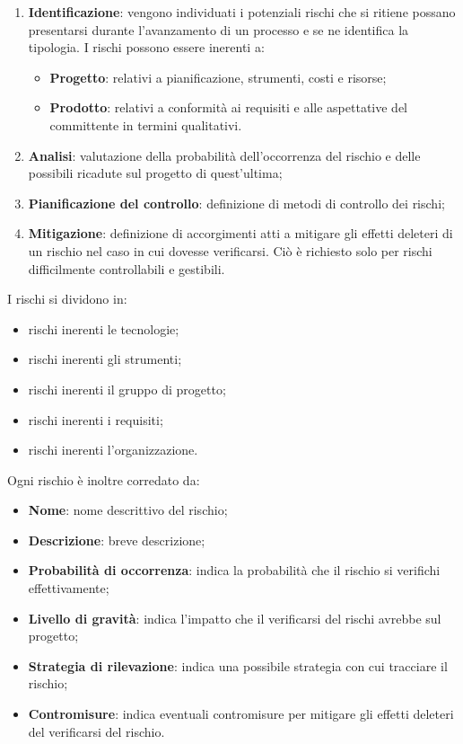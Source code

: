 \documentclass[../PianodiProgetto.tex]{subfiles}
\begin{document}
	\begin{enumerate}
		\item \textbf{Identificazione}: vengono individuati i potenziali rischi che si ritiene possano presentarsi durante
		l’avanzamento di un processo e se ne identifica la tipologia. I rischi possono essere inerenti a: 
		\begin{itemize}
			\item \textbf{Progetto}: relativi a pianificazione, strumenti, costi e risorse;
			\item \textbf{Prodotto}: relativi a conformità ai requisiti e alle aspettative del committente in termini qualitativi.
		\end{itemize}
		\item \textbf{Analisi}: valutazione della probabilità dell’occorrenza del rischio e delle possibili ricadute
		sul progetto di quest'ultima;
		\item \textbf{Pianificazione del controllo}: definizione di metodi di controllo dei rischi;
		\item \textbf{Mitigazione}: definizione di accorgimenti atti a mitigare gli effetti deleteri di un rischio nel caso in cui dovesse verificarsi. Ciò è richiesto solo per rischi
		difficilmente controllabili e gestibili.
	\end{enumerate}

	I rischi si dividono in:
		\begin{itemize}
			\item rischi inerenti le tecnologie;
			\item rischi inerenti gli strumenti;
			\item rischi inerenti il gruppo di progetto;
			\item rischi inerenti i requisiti;
			\item rischi inerenti l'organizzazione.
		\end{itemize}

	Ogni rischio è inoltre corredato da:
	
	\begin{itemize}
		\item \textbf{Nome}: nome descrittivo del rischio;
		\item \textbf{Descrizione}: breve descrizione;
		\item \textbf{Probabilità di occorrenza}: indica la probabilità che il rischio si verifichi effettivamente;
		\item \textbf{Livello di gravità}: indica l'impatto che il verificarsi del rischi avrebbe sul progetto;
		\item \textbf{Strategia di rilevazione}: indica una possibile strategia con cui tracciare il rischio;
		\item \textbf{Contromisure}: indica eventuali contromisure per mitigare gli effetti deleteri del verificarsi del rischio.
	\end{itemize}
	
\end{document}
